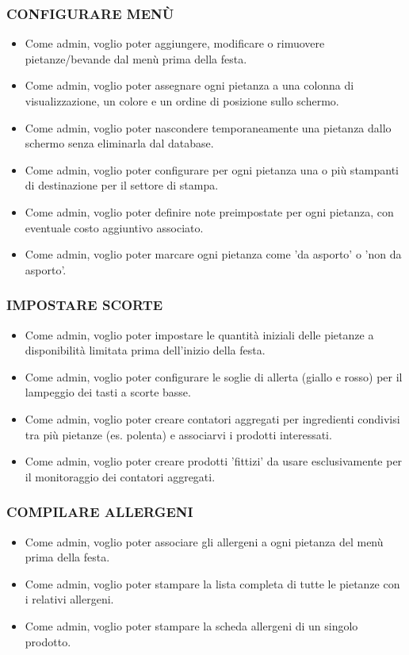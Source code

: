\subsubsection*{CONFIGURARE MENÙ}
\begin{itemize}
    \item Come admin, voglio poter aggiungere, modificare o rimuovere pietanze/bevande dal menù prima della festa.
    \item Come admin, voglio poter assegnare ogni pietanza a una colonna di visualizzazione, un colore e un ordine di posizione sullo schermo.
    \item Come admin, voglio poter nascondere temporaneamente una pietanza dallo schermo senza eliminarla dal database.
    \item Come admin, voglio poter configurare per ogni pietanza una o più stampanti di destinazione per il settore di stampa.
    \item Come admin, voglio poter definire note preimpostate per ogni pietanza, con eventuale costo aggiuntivo associato.
    \item Come admin, voglio poter marcare ogni pietanza come 'da asporto' o 'non da asporto'.
\end{itemize}

\subsubsection*{IMPOSTARE SCORTE}
\begin{itemize}
    \item Come admin, voglio poter impostare le quantità iniziali delle pietanze a disponibilità limitata prima dell'inizio della festa.
    \item Come admin, voglio poter configurare le soglie di allerta (giallo e rosso) per il lampeggio dei tasti a scorte basse.
    \item Come admin, voglio poter creare contatori aggregati per ingredienti condivisi tra più pietanze (es. polenta) e associarvi i prodotti interessati.
    \item Come admin, voglio poter creare prodotti 'fittizi' da usare esclusivamente per il monitoraggio dei contatori aggregati.
\end{itemize}

\subsubsection*{COMPILARE ALLERGENI}
\begin{itemize}
    \item Come admin, voglio poter associare gli allergeni a ogni pietanza del menù prima della festa.
    \item Come admin, voglio poter stampare la lista completa di tutte le pietanze con i relativi allergeni.
    \item Come admin, voglio poter stampare la scheda allergeni di un singolo prodotto.
\end{itemize}

